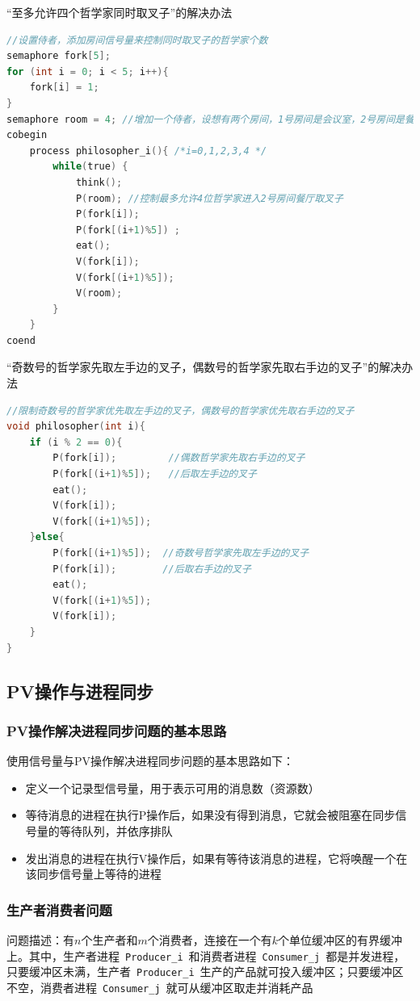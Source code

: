 \documentclass[cs4size,a4paper,10pt]{ctexart}
\begin{document}
	“至多允许四个哲学家同时取叉子”的解决办法

	\begin{lstlisting}[language=C, keywordstyle=\color{black}]
//设置侍者，添加房间信号量来控制同时取叉子的哲学家个数
semaphore fork[5];
for (int i = 0; i < 5; i++){
	fork[i] = 1;
}			  
semaphore room = 4; //增加一个侍者，设想有两个房间，1号房间是会议室，2号房间是餐厅
cobegin
	process philosopher_i(){ /*i=0,1,2,3,4 */
		while(true) {
			think();
			P(room); //控制最多允许4位哲学家进入2号房间餐厅取叉子
			P(fork[i]);
			P(fork[(i+1)%5]) ;
			eat();
			V(fork[i]);
			V(fork[(i+1)%5]);
			V(room);
		}
	}
coend		
	\end{lstlisting}

	“奇数号的哲学家先取左手边的叉子，偶数号的哲学家先取右手边的叉子”的解决办法
	\begin{lstlisting}[language=C, keywordstyle=\color{black}]
//限制奇数号的哲学家优先取左手边的叉子，偶数号的哲学家优先取右手边的叉子
void philosopher(int i){
	if (i % 2 == 0){
		P(fork[i]);         //偶数哲学家先取右手边的叉子
		P(fork[(i+1)%5]);   //后取左手边的叉子
		eat();
		V(fork[i]);
		V(fork[(i+1)%5]);
	}else{
		P(fork[(i+1)%5]);  //奇数号哲学家先取左手边的叉子
		P(fork[i]);        //后取右手边的叉子
		eat();
		V(fork[(i+1)%5]);
		V(fork[i]);
	}
}
	\end{lstlisting}

	\subsection{PV操作与进程同步}
	
	\subsubsection{PV操作解决进程同步问题的基本思路}
	使用信号量与PV操作解决进程同步问题的基本思路如下：
	\begin{itemize}
		\item 定义一个记录型信号量，用于表示可用的消息数（资源数）
		\item 等待消息的进程在执行P操作后，如果没有得到消息，它就会被阻塞在同步信号量的等待队列，并依序排队
		\item 发出消息的进程在执行V操作后，如果有等待该消息的进程，它将唤醒一个在该同步信号量上等待的进程
	\end{itemize}

	\subsubsection{生产者消费者问题}
	问题描述：有$n$个生产者和$m$个消费者，连接在一个有$k$个单位缓冲区的有界缓冲上。其中，生产者进程\ \verb|Producer_i|\ 和消费者进程\ \verb|Consumer_j|\ 都是并发进程，只要缓冲区未满，生产者\ \verb|Producer_i|\ 生产的产品就可投入缓冲区；只要缓冲区不空，消费者进程\ \verb|Consumer_j|\ 就可从缓冲区取走并消耗产品
\end{document}
